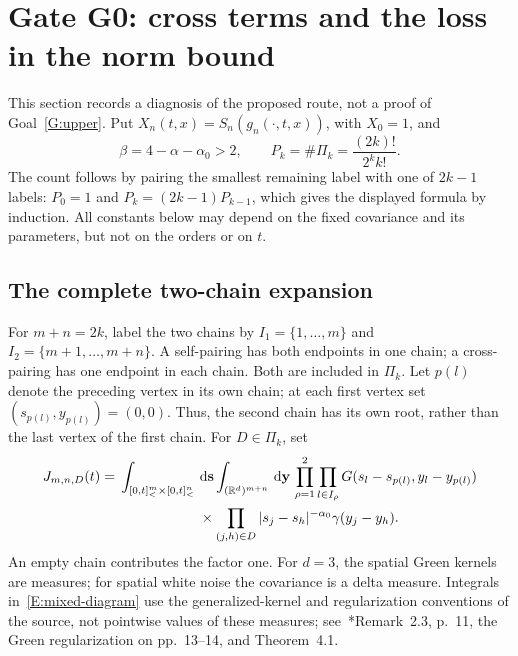 \documentclass[12pt]{article}
\numberwithin{equation}{section}
\theoremstyle{definition}
\newcommand{\R}{\mathbb{R}}
\newcommand{\ud}{\,\mathrm{d}}
\begin{document}
\section{Gate G0: cross terms and the loss in the norm bound}\label{S:G0}

This section records a diagnosis of the proposed route, not a proof of
Goal~\ref{G:upper}. Put $X_n(t,x)=S_n(g_n(\cdot,t,x))$, with $X_0=1$, and
\[
  \beta=4-\alpha-\alpha_0>2,\qquad
  P_k=\#\Pi_k=\frac{(2k)!}{2^k k!}.
\]
The count follows by pairing the smallest remaining label with one of
$2k-1$ labels: $P_0=1$ and $P_k=(2k-1)P_{k-1}$, which gives the displayed
formula by induction. All constants below may depend on the fixed covariance and its parameters,
but not on the orders or on $t$.

\subsection{The complete two-chain expansion}

For $m+n=2k$, label the two chains by
$I_1=\{1,\ldots,m\}$ and $I_2=\{m+1,\ldots,m+n\}$.
A self-pairing has both endpoints in one chain; a cross-pairing has one
endpoint in each chain. Both are included in $\Pi_k$.
Let $p(l)$ denote the preceding vertex in its own chain; at each first
vertex set $(s_{p(l)},y_{p(l)})=(0,0)$. Thus, the second chain has its own
root, rather than the last vertex of the first chain. For $D\in\Pi_k$, set
\begin{equation}\label{E:mixed-diagram}
  \begin{split}
    J_{m,n,D}(t)
    ={}&\int_{[0,t]^m_<\times[0,t]^n_<}\ud\mathbf s
    \int_{(\R^d)^{m+n}}\ud\mathbf y\,
    \prod_{\rho=1}^2\prod_{l\in I_\rho}
    G(s_l-s_{p(l)},y_l-y_{p(l)})\\
    &\hspace{20mm}\times
    \prod_{(j,h)\in D}|s_j-s_h|^{-\alpha_0}\gamma(y_j-y_h).
  \end{split}
\end{equation}
An empty chain contributes the factor one. For $d=3$, the spatial Green
kernels are measures; for spatial white noise the covariance is a delta
measure. Integrals in~\eqref{E:mixed-diagram} use the generalized-kernel
and regularization conventions of the source, not pointwise values of
these measures; see~\cite{chen:author2026:time-dependency}*{Remark~2.3,
p.~11, the Green regularization on pp.~13--14, and Theorem~4.1}.
\end{document}
